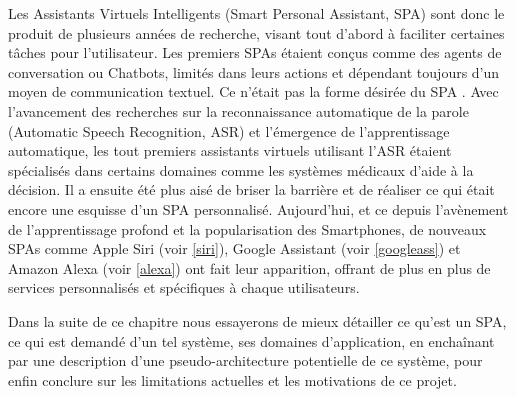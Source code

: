 \par 
Les Assistants Virtuels Intelligents (Smart Personal Assistant, SPA) sont donc le produit de plusieurs années de recherche, visant tout d'abord à faciliter certaines tâches pour l'utilisateur. Les premiers SPAs étaient conçus comme des agents de conversation ou Chatbots, limités dans leurs actions et dépendant toujours d'un moyen de communication textuel. Ce n'était pas la forme désirée du SPA \citep{rview}. Avec l'avancement des recherches sur la reconnaissance automatique de la parole (Automatic Speech Recognition, ASR) et l'émergence de l'apprentissage automatique, les tout premiers assistants virtuels utilisant l'ASR étaient spécialisés dans certains domaines comme les systèmes médicaux d'aide à la décision. Il a ensuite été plus aisé de briser la barrière et de réaliser ce qui était encore une esquisse d'un SPA personnalisé. Aujourd'hui, et ce depuis l'avènement de l'apprentissage profond et la popularisation des Smartphones, de nouveaux SPAs comme Apple Siri (voir \ref{siri}), Google Assistant (voir \ref{googleass}) et Amazon Alexa (voir \ref{alexa}) ont fait leur apparition, offrant de plus en plus de services personnalisés et spécifiques à chaque utilisateurs.
\par 

Dans la suite de ce chapitre nous essayerons de mieux détailler ce qu'est un SPA, ce qui est demandé d'un tel système, ses domaines d'application, en enchaînant par une description d'une pseudo-architecture potentielle de ce système, pour enfin  conclure sur les limitations actuelles et les motivations de ce projet. 

\newpage
